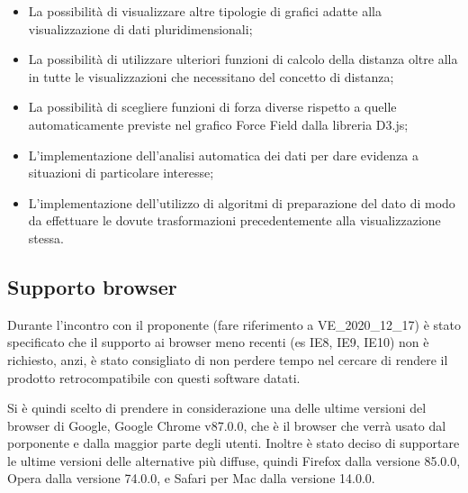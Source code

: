 \documentclass[../analisi-dei-requisiti.tex]{subfiles}
\begin{document}
\begin{itemize}
    \item La possibilità di visualizzare altre tipologie di grafici adatte alla visualizzazione di dati
    pluridimensionali;
    \item La possibilità di utilizzare ulteriori funzioni di calcolo della distanza oltre alla
     in tutte le visualizzazioni che necessitano del concetto di distanza;
    \item La possibilità di scegliere funzioni di forza diverse rispetto a quelle automaticamente previste nel grafico
    Force Field dalla libreria D3.js;
    \item L'implementazione dell'analisi automatica dei dati per dare evidenza a situazioni di particolare interesse;
    \item L'implementazione dell'utilizzo di algoritmi di preparazione del dato di modo da effettuare le dovute
    trasformazioni precedentemente alla visualizzazione stessa.
\end{itemize}

\subsection{Supporto browser}
\label{sub:supporto_browser}

Durante l'incontro con il proponente (fare riferimento a VE\_2020\_12\_17) è stato specificato che il supporto ai browser meno recenti (es IE8, IE9, IE10) non è richiesto, anzi, è stato consigliato di non perdere tempo nel cercare di rendere il prodotto retrocompatibile con questi software datati.

Si è quindi scelto di prendere in considerazione una delle ultime versioni del browser di Google, Google Chrome v87.0.0, che è il browser che verrà usato dal porponente e dalla maggior parte degli utenti. 
Inoltre è stato deciso di supportare le ultime versioni delle alternative più diffuse, quindi Firefox dalla versione 85.0.0, Opera dalla versione 74.0.0, e Safari per Mac dalla versione 14.0.0.
\end{document}
